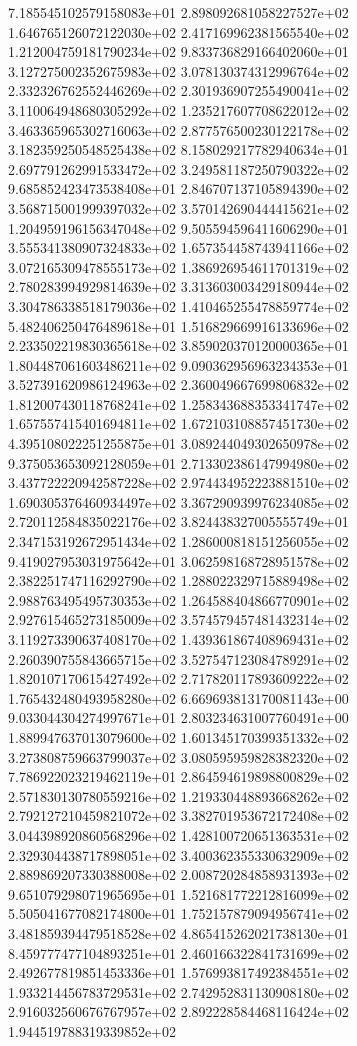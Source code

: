 7.185545102579158083e+01 2.898092681058227527e+02 1.646765126072122030e+02
2.417169962381565540e+02 1.212004759181790234e+02 9.833736829166402060e+01
3.127275002352675983e+02 3.078130374312996764e+02 2.332326762552446269e+02
2.301936907255490041e+02 3.110064948680305292e+02 1.235217607708622012e+02
3.463365965302716063e+02 2.877576500230122178e+02 3.182359250548525438e+02
8.158029217782940634e+01 2.697791262991533472e+02 3.249581187250790322e+02
9.685852423473538408e+01 2.846707137105894390e+02 3.568715001999397032e+02
3.570142690444415621e+02 1.204959196156347048e+02 9.505594596411606290e+01
3.555341380907324833e+02 1.657354458743941166e+02 3.072165309478555173e+02
1.386926954611701319e+02 2.780283994929814639e+02 3.313603003429180944e+02
3.304786338518179036e+02 1.410465255478859774e+02 5.482406250476489618e+01
1.516829669916133696e+02 2.233502219830365618e+02 3.859020370120000365e+01
1.804487061603486211e+02 9.090362956963234353e+01 3.527391620986124963e+02
2.360049667699806832e+02 1.812007430118768241e+02 1.258343688353341747e+02
1.657557415401694811e+02 1.672103108857451730e+02 4.395108022251255875e+01
3.089244049302650978e+02 9.375053653092128059e+01 2.713302386147994980e+02
3.437722220942587228e+02 2.974434952223881510e+02 1.690305376460934497e+02
3.367290939976234085e+02 2.720112584835022176e+02 3.824438327005555749e+01
2.347153192672951434e+02 1.286000818151256055e+02 9.419027953031975642e+01
3.062598168728951578e+02 2.382251747116292790e+02 1.288022329715889498e+02
2.988763495495730353e+02 1.264588404866770901e+02 2.927615465273185009e+02
3.574579457481432314e+02 3.119273390637408170e+02 1.439361867408969431e+02
2.260390755843665715e+02 3.527547123084789291e+02 1.820107170615427492e+02
2.717820117893609222e+02 1.765432480493958280e+02 6.669693813170081143e+00
9.033044304274997671e+01 2.803234631007760491e+00 1.889947637013079600e+02
1.601345170399351332e+02 3.273808759663799037e+02 3.080595959828382320e+02
7.786922023219462119e+01 2.864594619898800829e+02 2.571830130780559216e+02
1.219330448893668262e+02 2.792127210459821072e+02 3.382701953672172408e+02
3.044398920860568296e+02 1.428100720651363531e+02 2.329304438717898051e+02
3.400362355330632909e+02 2.889869207330388008e+02 2.008720284858931393e+02
9.651079298071965695e+01 1.521681772212816099e+02 5.505041677082174800e+01
1.752157879094956741e+02 3.481859394479518528e+02 4.865415262021738130e+01
8.459777477104893251e+01 2.460166322841731699e+02 2.492677819851453336e+01
1.576993817492384551e+02 1.933214456783729531e+02 2.742952831130908180e+02
2.916032560676767957e+02 2.892228584468116424e+02 1.944519788319339852e+02
